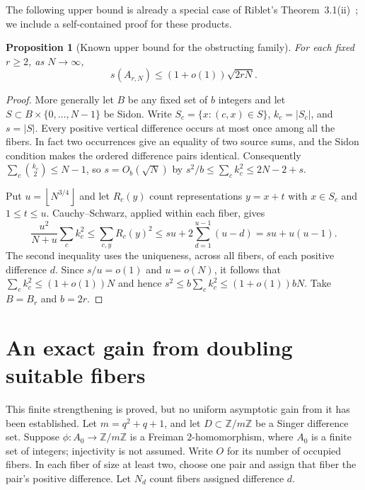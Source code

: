 \documentclass[11pt]{article}
\newtheorem{proposition}[theorem]{Proposition}
\theoremstyle{definition}
\theoremstyle{remark}
\newcommand{\floor}[1]{\left\lfloor #1\right\rfloor}
\begin{document}
The following upper bound is already a special case of
Riblet's Theorem~3.1(ii)~\cite{RibletIntervals}; we include a
self-contained proof for these products.
\begin{proposition}[Known upper bound for the obstructing family]
\label{prop:cluster-sidon-range}
For each fixed $r\ge2$, as $N\to\infty$,
\[
s(A_{r,N})\le(1+o(1))\sqrt{2rN}.
\]
\end{proposition}
\begin{proof}
More generally let $B$ be any fixed set of
$b$ integers and let $S\subset B\times\{0,\ldots,N-1\}$ be Sidon.
Write $S_c=\{x:(c,x)\in S\}$, $k_c=|S_c|$, and $s=|S|$.
Every positive vertical difference occurs at most once among all
the fibers. In fact two occurrences give an equality of two source
sums, and the Sidon condition makes the ordered difference pairs
identical. Consequently
$\sum_c\binom{k_c}{2}\le N-1$, so $s=O_b(\sqrt N)$ by
$s^2/b\le\sum_c k_c^2\le2N-2+s$.

Put $u=\floor{N^{3/4}}$ and let $R_c(y)$ count representations
$y=x+t$ with $x\in S_c$ and $1\le t\le u$. Cauchy--Schwarz,
applied within each fiber, gives
\[
\frac{u^2}{N+u}\sum_c k_c^2
\le\sum_{c,y}R_c(y)^2
\le su+2\sum_{d=1}^{u-1}(u-d)
=su+u(u-1).
\]
The second inequality uses the uniqueness, across all fibers,
of each positive difference $d$. Since $s/u=o(1)$ and $u=o(N)$,
it follows that $\sum_c k_c^2\le(1+o(1))N$ and hence
$s^2\le b\sum_c k_c^2\le(1+o(1))bN$.
Take $B=B_r$ and $b=2r$.
\end{proof}

\section{An exact gain from doubling suitable fibers}
This finite strengthening is proved, but no uniform asymptotic gain from it
has been established.  Let $m=q^2+q+1$, and let $D\subset\mathbb Z/m\mathbb Z$
be a Singer difference set.  Suppose $\phi:A_0\to\mathbb Z/m\mathbb Z$ is a
Freiman $2$-homomorphism, where $A_0$ is a finite set of integers; injectivity
is not assumed.  Write $O$ for its number of occupied fibers.  In each fiber
of size at least two, choose one pair and assign that fiber the pair's
positive difference.  Let $N_d$ count fibers assigned difference $d$.
\end{document}

